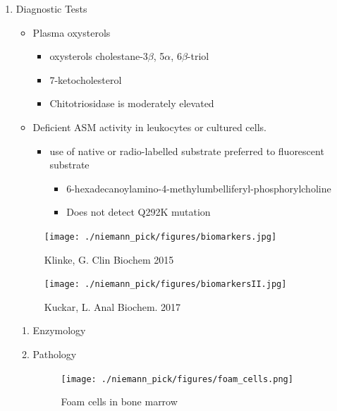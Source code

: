 \documentclass{scrartcl}
\begin{document}
\begin{enumerate}
\item Diagnostic Tests
\label{sec:orge664d6a}
\begin{itemize}
\item Plasma oxysterols
\begin{itemize}
\item oxysterols cholestane-3\(\beta\), 5\(\alpha\), 6\(\beta\)-triol
\item 7-ketocholesterol
\item Chitotriosidase is moderately elevated
\end{itemize}
\item Deficient ASM activity in leukocytes or cultured cells.
\begin{itemize}
\item use of native or radio-labelled substrate preferred to fluorescent substrate
\begin{itemize}
\item 6-hexadecanoylamino-4-methylumbelliferyl-phosphorylcholine
\item Does not detect Q292K mutation
\end{itemize}
\end{itemize}
\end{itemize}

\begin{figure}[htbp]
\centering
\texttt{[image: ./niemann\_pick/figures/biomarkers.jpg]}
\caption{\label{fig:org23b5d83}
Klinke, G. Clin Biochem 2015}
\end{figure}


\begin{figure}[htbp]
\centering
\texttt{[image: ./niemann\_pick/figures/biomarkersII.jpg]}
\caption{\label{fig:org9450aa3}
Kuckar, L. Anal Biochem. 2017}
\end{figure}

\begin{enumerate}
\item Enzymology
\label{sec:org4d3189b}


\item Pathology
\label{sec:orgd3602f6}
\begin{figure}[htbp]
\centering
\texttt{[image: ./niemann\_pick/figures/foam\_cells.png]}
\caption{\label{fig:orgbdd2cee}
Foam cells in bone marrow}
\end{figure}
\end{enumerate}




\end{enumerate}
\end{document}
